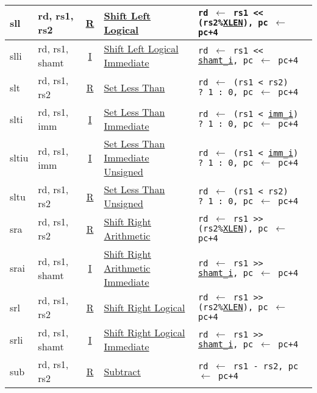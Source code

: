 {\begin{tabular}{|ll|c|l|l|}
\hline
sll   & rd, rs1, rs2   & \hyperref[insnformat:rtype]{R} & \hyperref[insn:sll]{Shift Left Logical}        & {\tt rd $\leftarrow$ rs1 << (rs2\%\hyperref[XLEN]{XLEN}), pc $\leftarrow$ pc+4}\\
\hline
slli  & rd, rs1, shamt & \hyperref[insnformat:itype]{I} & \hyperref[insn:slli]{Shift Left Logical Immediate} & {\tt rd $\leftarrow$ rs1 << \hyperref[shamt.i:decode]{shamt\_i}, pc $\leftarrow$ pc+4}\\
\hline
slt   & rd, rs1, rs2   & \hyperref[insnformat:rtype]{R} & \hyperref[insn:slt]{Set Less Than}             & {\tt rd $\leftarrow$ (rs1 < rs2) ?\ 1 :\ 0, pc $\leftarrow$ pc+4}\\
\hline
slti  & rd, rs1, imm  & \hyperref[insnformat:itype]{I} & \hyperref[insn:slti]{Set Less Than Immediate}   & {\tt rd $\leftarrow$ (rs1 < \hyperref[imm.i:decode]{imm\_i}) ?\ 1 :\ 0, pc $\leftarrow$ pc+4}\\
\hline
sltiu & rd, rs1, imm  & \hyperref[insnformat:itype]{I} & \hyperref[insn:sltiu]{Set Less Than Immediate Unsigned} & {\tt rd $\leftarrow$ (rs1 < \hyperref[imm.i:decode]{imm\_i}) ?\ 1 :\ 0, pc $\leftarrow$ pc+4}\\
\hline
sltu  & rd, rs1, rs2   & \hyperref[insnformat:rtype]{R} & \hyperref[insn:sltu]{Set Less Than Unsigned}   & {\tt rd $\leftarrow$ (rs1 < rs2) ?\ 1 :\ 0, pc $\leftarrow$ pc+4}\\
\hline
sra   & rd, rs1, rs2   & \hyperref[insnformat:rtype]{R} & \hyperref[insn:sra]{Shift Right Arithmetic}    & {\tt rd $\leftarrow$ rs1 >> (rs2\%\hyperref[XLEN]{XLEN}), pc $\leftarrow$ pc+4}\\
\hline
srai  & rd, rs1, shamt & \hyperref[insnformat:itype]{I} & \hyperref[insn:srai]{Shift Right Arithmetic Immediate} & {\tt rd $\leftarrow$ rs1 >> \hyperref[shamt.i:decode]{shamt\_i}, pc $\leftarrow$ pc+4}\\
\hline
srl   & rd, rs1, rs2   & \hyperref[insnformat:rtype]{R} & \hyperref[insn:srl]{Shift Right Logical}       & {\tt rd $\leftarrow$ rs1 >> (rs2\%\hyperref[XLEN]{XLEN}), pc $\leftarrow$ pc+4}\\
\hline
srli  & rd, rs1, shamt & \hyperref[insnformat:itype]{I} & \hyperref[insn:srli]{Shift Right Logical Immediate} & {\tt rd $\leftarrow$ rs1 >> \hyperref[shamt.i:decode]{shamt\_i}, pc $\leftarrow$ pc+4}\\
\hline
sub   & rd, rs1, rs2   & \hyperref[insnformat:rtype]{R} & \hyperref[insn:sub]{Subtract}                  & {\tt rd $\leftarrow$ rs1 - rs2, pc $\leftarrow$ pc+4}\\

\end{tabular}}
